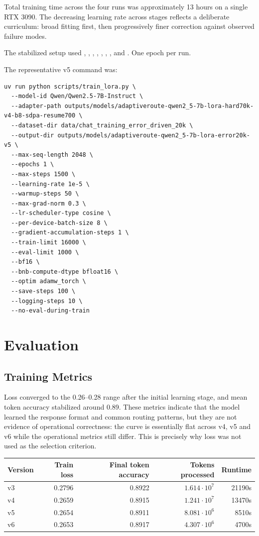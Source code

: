 \documentclass[11pt,a4paper]{article}
\newcommand{\toprule}{\hline}
\newcommand{\midrule}{\hline}
\newcommand{\bottomrule}{\hline}
\begin{document}
Total training time across the four runs was approximately 13 hours on a single RTX 3090. The
decreasing learning rate across stages reflects a deliberate curriculum: broad fitting first, then
progressively finer correction against observed failure modes.

The stabilized setup used , ,
, ,
, , ,
 and . One epoch per run.

The representative v5 command was:

\begin{verbatim}
uv run python scripts/train_lora.py \
  --model-id Qwen/Qwen2.5-7B-Instruct \
  --adapter-path outputs/models/adaptiveroute-qwen2_5-7b-lora-hard70k-v4-b8-sdpa-resume700 \
  --dataset-dir data/chat_training_error_driven_20k \
  --output-dir outputs/models/adaptiveroute-qwen2_5-7b-lora-error20k-v5 \
  --max-seq-length 2048 \
  --epochs 1 \
  --max-steps 1500 \
  --learning-rate 1e-5 \
  --warmup-steps 50 \
  --max-grad-norm 0.3 \
  --lr-scheduler-type cosine \
  --per-device-batch-size 8 \
  --gradient-accumulation-steps 1 \
  --train-limit 16000 \
  --eval-limit 1000 \
  --bf16 \
  --bnb-compute-dtype bfloat16 \
  --optim adamw_torch \
  --save-steps 100 \
  --logging-steps 10 \
  --no-eval-during-train
\end{verbatim}

\section{Evaluation}

\subsection{Training Metrics}

Loss converged to the 0.26--0.28 range after the initial learning stage, and mean token accuracy
stabilized around 0.89. These metrics indicate that the model learned the response format and common
routing patterns, but they are not evidence of operational correctness: the curve is essentially flat
across v4, v5 and v6 while the operational metrics still differ. This is precisely why loss was not
used as the selection criterion.

\begin{table}[h]
\centering
\begin{tabular}{lrrrr}
\toprule
Version & Train loss & Final token accuracy & Tokens processed & Runtime \\
\midrule
v3 & 0.2796 & 0.8922 & $1.614\cdot10^7$ & 21190s \\
v4 & 0.2659 & 0.8915 & $1.241\cdot10^7$ & 13470s \\
v5 & 0.2654 & 0.8911 & $8.081\cdot10^6$ & 8510s \\
v6 & 0.2653 & 0.8917 & $4.307\cdot10^6$ & 4700s \\
\bottomrule
\end{tabular}
\end{table}
\end{document}
